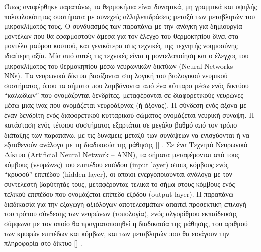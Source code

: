 \documentclass[12pt, a4paper]{report} %
\DeclareRobustCommand{\lcitep}[1]{%
  \english{[\cite{#1}]}%
}
\newcommand{\english}{\foreignlanguage{english}}
\begin{document}
Όπως αναφέρθηκε παραπάνω, τα θερμοκήπια είναι δυναμικά, μη γραμμικά και υψηλής πολυπλοκότητας συστήματα με συνεχείς 
αλληλεπιδράσεις μεταξύ των μεταβλητών του μικροκλίματός τους. Ο συνδυασμός των παραπάνω με την ανάγκη για δημιουργία 
μοντέλων που θα εφαρμοστούν άμεσα για τον έλεγχο του θερμοκηπίου δίνει στα μοντέλα μαύρου κουτιού, και γενικότερα στις 
τεχνικές της τεχνητής νοημοσύνης ιδιαίτερη αξία. Μία από αυτές τις τεχνικές είναι η μοντελοποίηση και ο έλεγχος του 
μικροκλίματος του θερμοκηπίου μέσω νευρωνικών δικτύων (\english{Neural Networks – NNs}). Τα νευρωνικά δίκτυα βασίζονται 
στη λογική του βιολογικού νευρικού συστήματος, όπου τα σήματα που λαμβάνονται από ένα κύτταρο μέσω ενός δικτύου “καλωδίων” 
που ονομάζονται δενδρίτες, μεταφέρονται σε διαφορετικούς νευρώνες μέσω μιας ίνας που ονομάζεται νευροάξονας (ή άξονας). 
Η σύνδεση ενός άξονα με έναν δενδρίτη ενός διαφορετικού κυτταρικού σώματος ονομάζεται νευρική σύναψη. Η κατάσταση ενός 
τέτοιου συστήματος εξαρτάται σε μεγάλο βαθμό από τον τρόπο διάταξης των παραπάνω, με τις δυνάμεις μεταξύ των συνάψεων να 
ενισχύονται ή να εξασθενούν ανάλογα με τη διαδικασία της μάθησης \lcitep{neural_bib10}. Σε ένα Τεχνητό Νευρωνικό Δίκτυο 
(\english{Artificial Neural Network – ANN}), τα σήματα μεταφέρονται από τους κόμβους (νευρώνες) του επιπέδου εισόδου 
(\english{input layer}) στους κόμβους ενός “κρυφού” επιπέδου (\english{hidden layer}), οι οποίοι ενεργοποιούνται ανάλογα 
με τον συντελεστή βαρύτητάς τους, μεταφέροντας τελικά το σήμα στους κόμβους ενός τελικού επιπέδου που ονομάζεται επίπεδο 
εξόδου (\english{output layer}). Η παραπάνω διαδικασία για την εξαγωγή αξιόλογων αποτελεσμάτων απαιτεί προσεκτική επιλογή 
του τρόπου σύνδεσης των νευρώνων (τοπολογία), ενός αλγορίθμου εκπαίδευσης σύμφωνα με τον οποίο θα πραγματοποιηθεί η 
διαδικασία της μάθησης, του αριθμού των κρυφών επιπέδων και κόμβων, και των μεταβλητών που θα εισάγουν την πληροφορία στο 
δίκτυο \lcitep{neural_bib11}.
\end{document}
